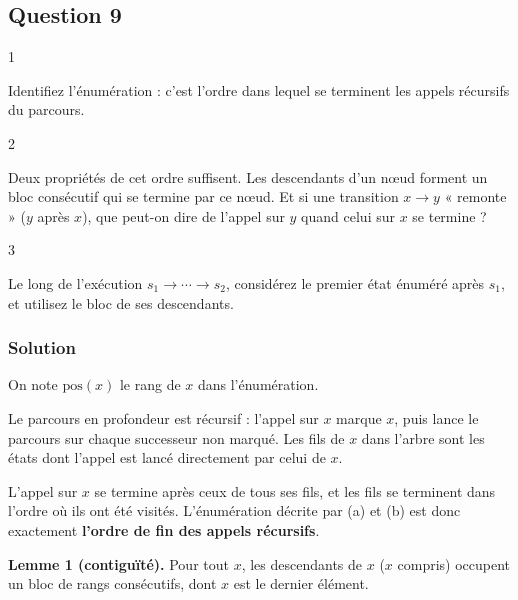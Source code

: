\documentclass[11pt,a4paper]{article}
\begin{document}
\hypertarget{question-9}{%
\subsection{Question 9}\label{question-9}}

\begin{indication}{1}

Identifiez l'énumération : c'est l'ordre dans lequel se terminent les appels récursifs du parcours.

\end{indication}

\begin{indication}{2}

Deux propriétés de cet ordre suffisent. Les descendants d'un nœud forment un bloc consécutif qui se termine par ce nœud. Et si une transition \(x\to y\) « remonte » (\(y\) après \(x\)), que peut-on dire de l'appel sur \(y\) quand celui sur \(x\) se termine ?

\end{indication}

\begin{indication}{3}

Le long de l'exécution \(s_1\to\cdots\to s_2\), considérez le premier état énuméré après \(s_1\), et utilisez le bloc de ses descendants.

\end{indication}

\hypertarget{solution-8}{%
\subsubsection{Solution}\label{solution-8}}

On note \(\mathrm{pos}(x)\) le rang de \(x\) dans l'énumération.

Le parcours en profondeur est récursif : l'appel sur \(x\) marque \(x\), puis lance le parcours sur chaque successeur non marqué. Les fils de \(x\) dans l'arbre sont les états dont l'appel est lancé directement par celui de \(x\).

L'appel sur \(x\) se termine après ceux de tous ses fils, et les fils se terminent dans l'ordre où ils ont été visités. L'énumération décrite par (a) et (b) est donc exactement \textbf{l'ordre de fin des appels récursifs}.

\textbf{Lemme 1 (contiguïté).} Pour tout \(x\), les descendants de \(x\) (\(x\) compris) occupent un bloc de rangs consécutifs, dont \(x\) est le dernier élément.
\end{document}
